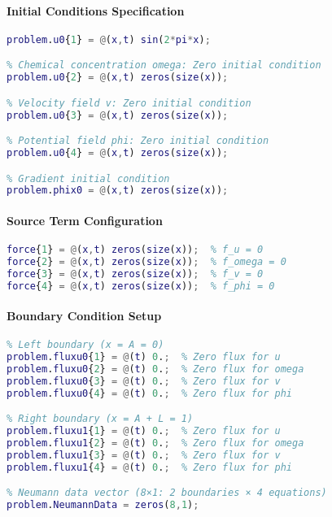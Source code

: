 \paragraph{Initial Conditions Specification}
\begin{lstlisting}[language=Matlab, caption=TestProblem.m Initial Conditions]
% Cell density u: Non-trivial sinusoidal profile
problem.u0{1} = @(x,t) sin(2*pi*x);  

% Chemical concentration omega: Zero initial condition
problem.u0{2} = @(x,t) zeros(size(x));

% Velocity field v: Zero initial condition  
problem.u0{3} = @(x,t) zeros(size(x));

% Potential field phi: Zero initial condition
problem.u0{4} = @(x,t) zeros(size(x));

% Gradient initial condition
problem.phix0 = @(x,t) zeros(size(x));
\end{lstlisting}

\paragraph{Source Term Configuration}
\begin{lstlisting}[language=Matlab, caption=TestProblem.m Source Terms]
% All source terms are zero - homogeneous problem
force{1} = @(x,t) zeros(size(x));  % f_u = 0
force{2} = @(x,t) zeros(size(x));  % f_omega = 0  
force{3} = @(x,t) zeros(size(x));  % f_v = 0
force{4} = @(x,t) zeros(size(x));  % f_phi = 0
\end{lstlisting}

\paragraph{Boundary Condition Setup}
\begin{lstlisting}[language=Matlab, caption=TestProblem.m Boundary Conditions]
% Neumann flux conditions at both boundaries
% Left boundary (x = A = 0)
problem.fluxu0{1} = @(t) 0.;  % Zero flux for u
problem.fluxu0{2} = @(t) 0.;  % Zero flux for omega
problem.fluxu0{3} = @(t) 0.;  % Zero flux for v
problem.fluxu0{4} = @(t) 0.;  % Zero flux for phi

% Right boundary (x = A + L = 1)
problem.fluxu1{1} = @(t) 0.;  % Zero flux for u
problem.fluxu1{2} = @(t) 0.;  % Zero flux for omega
problem.fluxu1{3} = @(t) 0.;  % Zero flux for v
problem.fluxu1{4} = @(t) 0.;  % Zero flux for phi

% Neumann data vector (8×1: 2 boundaries × 4 equations)
problem.NeumannData = zeros(8,1);
\end{lstlisting}

